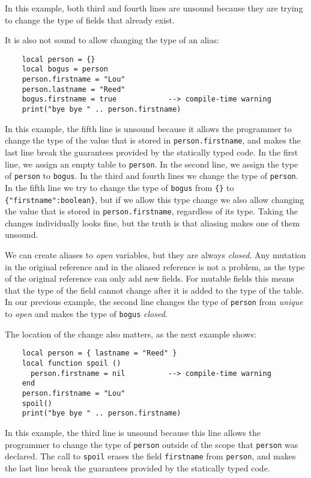 In this example, both third and fourth lines are unsound because
they are trying to change the type of fields that already exist.

It is also not sound to allow changing the type of an alias:
\begin{verbatim}
    local person = {}
    local bogus = person
    person.firstname = "Lou"
    person.lastname = "Reed"
    bogus.firstname = true            --> compile-time warning
    print("bye bye " .. person.firstname)
\end{verbatim}

In this example, the fifth line is unsound because it allows the
programmer to change the type of the value that is stored in
\texttt{person.firstname}, and makes the last line break the
guarantees provided by the statically typed code.
In the first line, we assign an empty table to \texttt{person}.
In the second line, we assign the type of \texttt{person} to
\texttt{bogus}.
In the third and fourth lines we change the type of \texttt{person}.
In the fifth line we try to change the type of \texttt{bogus}
from \texttt{\{\}} to \texttt{\{"firstname":boolean\}},
but if we allow this type change we also allow changing the value
that is stored in \texttt{person.firstname}, regardless of its type.
Taking the changes individually looks fine, but the truth is that
aliasing makes one of them unsound.

We can create aliases to \emph{open} variables, but they are always
\emph{closed}.
Any mutation in the original reference and in the aliased reference
is not a problem, as the type of the original reference can only
add new fields.
For mutable fields this means that the type of the field cannot
change after it is added to the type of the table.
In our previous example, the second line changes the type of
\texttt{person} from \emph{unique} to \emph{open} and makes the type of
\texttt{bogus} \emph{closed}.

The location of the change also matters, as the next example shows:
\begin{verbatim}
    local person = { lastname = "Reed" }
    local function spoil ()
      person.firstname = nil          --> compile-time warning
    end
    person.firstname = "Lou"
    spoil()
    print("bye bye " .. person.firstname)
\end{verbatim}

In this example, the third line is unsound because this line allows
the programmer to change the type of \texttt{person} outside of the
scope that \texttt{person} was declared.
The call to \texttt{spoil} erases the field \texttt{firstname} from
\texttt{person}, and makes the last line break the guarantees
provided by the statically typed code.

